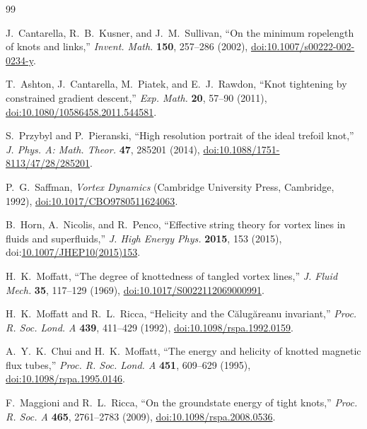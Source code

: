 \documentclass[aps,pre,preprint,notitlepage,nofootinbib,superscriptaddress]{revtex4-2}
\begin{document}
\begin{thebibliography}{99}

J.~Cantarella, R.~B.~Kusner, and J.~M.~Sullivan,
``On the minimum ropelength of knots and links,''
\emph{Invent. Math.} \textbf{150}, 257--286 (2002),
\href{https://doi.org/10.1007/s00222-002-0234-y}{doi:10.1007/s00222-002-0234-y}.

T.~Ashton, J.~Cantarella, M.~Piatek, and E.~J.~Rawdon,
``Knot tightening by constrained gradient descent,''
\emph{Exp. Math.} \textbf{20}, 57--90 (2011),
\href{https://doi.org/10.1080/10586458.2011.544581}{doi:10.1080/10586458.2011.544581}.

S.~Przybyl and P.~Pieranski,
``High resolution portrait of the ideal trefoil knot,''
\emph{J. Phys. A: Math. Theor.} \textbf{47}, 285201 (2014),
\href{https://doi.org/10.1088/1751-8113/47/28/285201}{doi:10.1088/1751-8113/47/28/285201}.

P.~G.~Saffman,
\emph{Vortex Dynamics}
(Cambridge University Press, Cambridge, 1992),
\href{https://doi.org/10.1017/CBO9780511624063}{doi:10.1017/CBO9780511624063}.

B.~Horn, A.~Nicolis, and R.~Penco,
``Effective string theory for vortex lines in fluids and superfluids,''
\emph{J. High Energy Phys.} \textbf{2015}, 153 (2015),
doi:\href{https://doi.org/10.1007/JHEP10(2015)153}{10.1007/JHEP10(2015)153}.

H.~K.~Moffatt,
``The degree of knottedness of tangled vortex lines,''
\emph{J. Fluid Mech.} \textbf{35}, 117--129 (1969),
\href{https://doi.org/10.1017/S0022112069000991}{doi:10.1017/S0022112069000991}.

H.~K.~Moffatt and R.~L.~Ricca,
``Helicity and the C\u{a}lug\u{a}reanu invariant,''
\emph{Proc. R. Soc. Lond. A} \textbf{439}, 411--429 (1992),
\href{https://doi.org/10.1098/rspa.1992.0159}{doi:10.1098/rspa.1992.0159}.

A.~Y.~K.~Chui and H.~K.~Moffatt,
``The energy and helicity of knotted magnetic flux tubes,''
\emph{Proc. R. Soc. Lond. A} \textbf{451}, 609--629 (1995),
\href{https://doi.org/10.1098/rspa.1995.0146}{doi:10.1098/rspa.1995.0146}.

F.~Maggioni and R.~L.~Ricca,
``On the groundstate energy of tight knots,''
\emph{Proc. R. Soc. A} \textbf{465}, 2761--2783 (2009),
\href{https://doi.org/10.1098/rspa.2008.0536}{doi:10.1098/rspa.2008.0536}.


\end{thebibliography}
\end{document}
